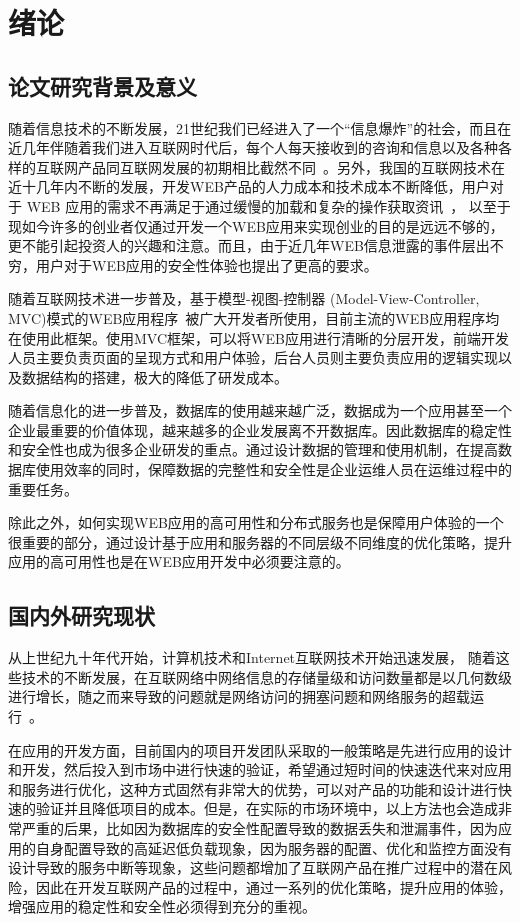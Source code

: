 \chapter{绪论}
\label{cha:introduction}
\section{论文研究背景及意义}
随着信息技术的不断发展，21世纪我们已经进入了一个“信息爆炸”的社会，而且在近几年伴随着我们进入互联网时代后，每个人每天接收到的咨询和信息以及各种各样的互联网产品同互联网发展的初期相比截然不同~\cite{林薇2015基于}。另外，我国的互联网技术在近十几年内不断的发展，开发WEB产品的人力成本和技术成本不断降低，用户对于 WEB 应用的需求\cite{邵志强2015跨媒体检索平台}不再满足于通过缓慢的加载和复杂的操作获取资讯~\cite{贺海梁2012基于}，
以至于现如今许多的创业者仅通过开发一个WEB应用来实现创业的目的是远远不够的，更不能引起投资人的兴趣和注意。而且，由于近几年WEB信息泄露的事件层出不穷，用户对于WEB应用的安全性体验也提出了更高的要求。

随着互联网技术进一步普及，基于模型-视图-控制器
(Model-View-Controller, MVC)模式的WEB应用程序~\cite{张2010基于}被广大开发者所使用，目前主流的WEB应用程序均在使用此框架。使用MVC框架，可以将WEB应用进行清晰的分层开发，前端开发人员主要负责页面的呈现方式和用户体验，后台人员则主要负责应用的逻辑实现以及数据结构的搭建，极大的降低了研发成本。

随着信息化的进一步普及，数据库的使用越来越广泛，数据成为一个应用甚至一个企业最重要的价值体现，越来越多的企业发展离不开数据库。因此数据库的稳定性和安全性也成为很多企业研发的重点。通过设计数据的管理和使用机制，在提高数据库使用效率的同时，保障数据的完整性和安全性是企业运维人员在运维过程中的重要任务。

除此之外，如何实现WEB应用的高可用性和分布式服务也是保障用户体验的一个很重要的部分，通过设计基于应用和服务器的不同层级不同维度的优化策略，提升应用的高可用性也是在WEB应用开发中必须要注意的。

\section{国内外研究现状}
从上世纪九十年代开始，计算机技术和Internet互联网技术开始迅速发展， 随着这些技术的不断发展，在互联网络中网络信息的存储量级和访问数量都是以几何数级进行增长，随之而来导致的问题就是网络访问的拥塞问题和网络服务的超载运行~\cite{王霜2004web}。

在应用的开发方面，目前国内的项目开发团队采取的一般策略是先进行应用的设计和开发，然后投入到市场中进行快速的验证，希望通过短时间的快速迭代来对应用和服务进行优化，这种方式固然有非常大的优势，可以对产品的功能和设计进行快速的验证并且降低项目的成本。但是，在实际的市场环境中，以上方法也会造成非常严重的后果，比如因为数据库的安全性配置导致的数据丢失和泄漏事件，因为应用的自身配置导致的高延迟低负载现象，因为服务器的配置、优化和监控方面没有设计导致的服务中断等现象，这些问题都增加了互联网产品在推广过程中的潜在风险，因此在开发互联网产品的过程中，通过一系列的优化策略，提升应用的体验，增强应用的稳定性和安全性必须得到充分的重视。

